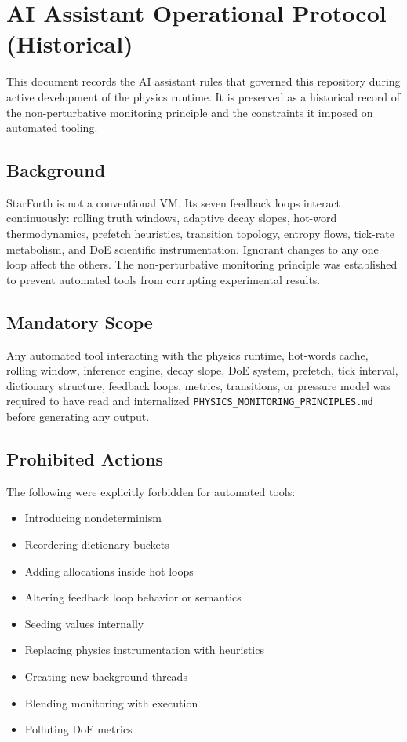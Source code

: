 
\section{AI Assistant Operational Protocol (Historical)}

This document records the AI assistant rules that governed this repository
during active development of the physics runtime. It is preserved as a
historical record of the non-perturbative monitoring principle and the
constraints it imposed on automated tooling.

\subsection{Background}

StarForth is not a conventional VM. Its seven feedback loops interact
continuously: rolling truth windows, adaptive decay slopes, hot-word
thermodynamics, prefetch heuristics, transition topology, entropy flows,
tick-rate metabolism, and DoE scientific instrumentation. Ignorant changes
to any one loop affect the others. The non-perturbative monitoring principle
was established to prevent automated tools from corrupting experimental
results.

\subsection{Mandatory Scope}

Any automated tool interacting with the physics runtime, hot-words cache,
rolling window, inference engine, decay slope, DoE system, prefetch, tick
interval, dictionary structure, feedback loops, metrics, transitions, or
pressure model was required to have read and internalized
\texttt{PHYSICS\_MONITORING\_PRINCIPLES.md} before generating any output.

\subsection{Prohibited Actions}

The following were explicitly forbidden for automated tools:

\begin{itemize}
  \item Introducing nondeterminism
  \item Reordering dictionary buckets
  \item Adding allocations inside hot loops
  \item Altering feedback loop behavior or semantics
  \item Seeding values internally
  \item Replacing physics instrumentation with heuristics
  \item Creating new background threads
  \item Blending monitoring with execution
  \item Polluting DoE metrics
\end{itemize}

